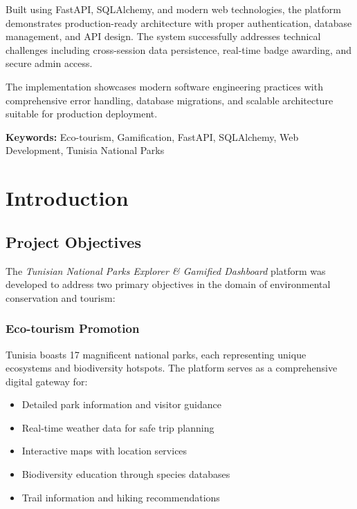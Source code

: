 \documentclass[11pt,a4paper]{article}
\begin{document}
Built using FastAPI, SQLAlchemy, and modern web technologies, the platform demonstrates production-ready architecture with proper authentication, database management, and API design. The system successfully addresses technical challenges including cross-session data persistence, real-time badge awarding, and secure admin access.

The implementation showcases modern software engineering practices with comprehensive error handling, database migrations, and scalable architecture suitable for production deployment.

\textbf{Keywords:} Eco-tourism, Gamification, FastAPI, SQLAlchemy, Web Development, Tunisia National Parks

\section{Introduction}
\label{sec:introduction}

\subsection{Project Objectives}

The \textit{Tunisian National Parks Explorer \& Gamified Dashboard} platform was developed to address two primary objectives in the domain of environmental conservation and tourism:

\subsubsection{Eco-tourism Promotion}
Tunisia boasts 17 magnificent national parks, each representing unique ecosystems and biodiversity hotspots. The platform serves as a comprehensive digital gateway for:
\begin{itemize}
    \item Detailed park information and visitor guidance
    \item Real-time weather data for safe trip planning
    \item Interactive maps with location services
    \item Biodiversity education through species databases
    \item Trail information and hiking recommendations
\end{itemize}
\end{document}
